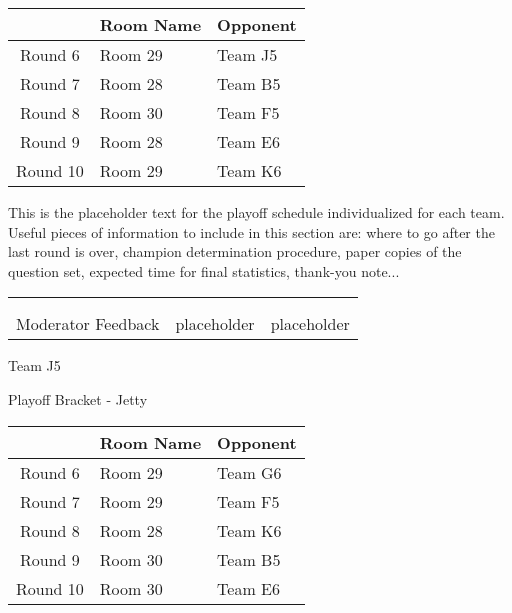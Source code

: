 \documentclass{article}%
\begin{document}
\vspace*{4pt}%
%
\begin{tabularx}{\textwidth}{|c|Y|Y|}%
\hline%
&Room Name&Opponent\\%
\hline%
Round 6&Room 29&Team J5\\%
Round 7&Room 28&Team B5\\%
Round 8&Room 30&Team F5\\%
Round 9&Room 28&Team E6\\%
Round 10&Room 29&Team K6\\%
\hline%
\end{tabularx}%
\vspace*{30pt}%
\linebreak%
This is the placeholder text for the playoff schedule individualized for each team. Useful pieces of information to include in this section are: where to go after the last round is over, champion determination procedure, paper copies of the question set, expected time for final statistics, thank{-}you note...%
\vspace*{30pt}%
\newline%
%
\begin{tabularx}{\textwidth}{YYY}%
  &  &  \\%
\\%
Moderator Feedback&placeholder&placeholder\\%
\end{tabularx}%
\newpage%
\begin{center}%
\begin{Huge}%
Team J5%
\end{Huge}%
\vspace*{12pt}%
\linebreak%
\begin{Large}%
Playoff Bracket {-} Jetty%
\end{Large}%
\end{center}%
\vspace*{4pt}%
%
\begin{tabularx}{\textwidth}{|c|Y|Y|}%
\hline%
&Room Name&Opponent\\%
\hline%
Round 6&Room 29&Team G6\\%
Round 7&Room 29&Team F5\\%
Round 8&Room 28&Team K6\\%
Round 9&Room 30&Team B5\\%
Round 10&Room 30&Team E6\\%
\hline%
\end{tabularx}%
\end{document}

